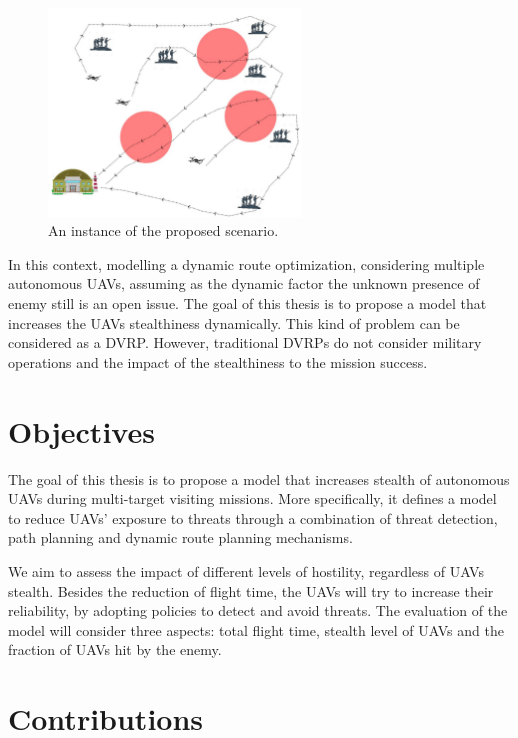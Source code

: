 \begin{figure}[h!]
    \centering
    \includegraphics[width=0.6\textwidth]{Figures/scenario.JPG}
    \caption{An instance of the proposed scenario.}
    \label{fig:scenario}
\end{figure}


In this context, modelling a dynamic route optimization, considering multiple autonomous UAVs, assuming as the dynamic factor the unknown presence of enemy still is an open issue. The goal of this thesis is to propose a model that increases the UAVs stealthiness dynamically. This kind of problem can be considered as a DVRP. However, traditional DVRPs do not consider military operations and the impact of the stealthiness to the mission success.

\section{Objectives}

The goal of this thesis is to propose a model that increases stealth of autonomous UAVs during multi-target visiting missions. More specifically, it defines a model to reduce UAVs' exposure to threats through a combination of threat detection, path planning and dynamic route planning mechanisms.

We aim to assess the impact of different levels of hostility, regardless of UAVs stealth. Besides the reduction of flight time, the UAVs will try to increase their reliability, by adopting policies to detect and avoid threats. The evaluation of the model will consider three aspects: total flight time, stealth level of UAVs and the fraction of UAVs hit by the enemy.

\section{Contributions}

